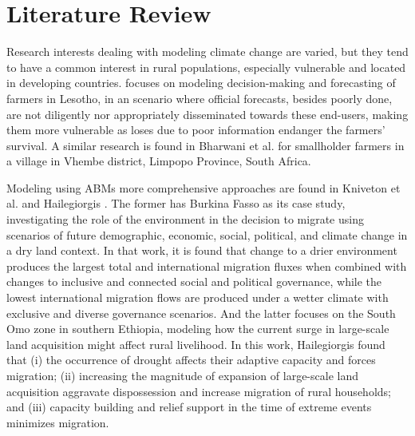 \documentclass[doc,12pt,floatsintext]{apa7}
\begin{document}
\section{Literature Review}

Research interests dealing with modeling climate change are varied, but they tend to have a common interest in rural populations, especially vulnerable and located in developing countries. \Textcite{ziervogel_agent-based_2005}  focuses on modeling decision-making and forecasting of farmers in Lesotho, in an scenario where official forecasts, besides poorly done, are not diligently nor appropriately disseminated towards these end-users, making them more vulnerable as loses due to poor information endanger the farmers' survival. A similar research is found in Bharwani et al. \parencite{bharwani_multi-agent_2005} for smallholder farmers in a village in Vhembe district, Limpopo Province, South Africa. 

Modeling using ABMs more comprehensive approaches are found in Kniveton et al. \parencite{kniveton_agent-based_2011} and Hailegiorgis \parencite{hailegiorgis_computational_2013}. The former has Burkina Fasso as its case study, investigating the role of the environment in the decision to migrate using scenarios of future demographic, economic, social, political, and climate change in a dry land context. In that work, it is found that change to a drier environment produces the largest total and international migration fluxes when combined with changes to inclusive and connected social and political governance, while the lowest international migration flows are produced under a wetter climate with exclusive and diverse governance scenarios. And the latter focuses on the South Omo zone in southern Ethiopia, modeling how the current surge in large-scale land acquisition might affect rural livelihood. In this work,  Hailegiorgis found that (i) the occurrence of drought affects their adaptive capacity and forces migration; (ii) increasing the magnitude of expansion of large-scale land acquisition aggravate dispossession and increase migration of rural households; and (iii) capacity building and relief support in the time of extreme events minimizes migration. 
\end{document}
